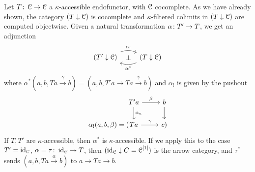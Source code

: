 \documentclass[a4paper,11pt,oneside,openany]{scrbook}
\begin{document}
Let $ T\colon \operatorname{\mathcal{C}} \to \operatorname{\mathcal{C}} $ a $ \kappa $-accessible endofunctor, with $ \operatorname{\mathcal{C}} $ cocomplete.
As we have already shown, the category $ (T \downarrow \operatorname{\mathcal{C}} )$ is cocomplete and $ \kappa $-filtered colimits in $ (T\downarrow\operatorname{\mathcal{C}}) $ are computed objectwise.
Given a natural transformation $ \alpha \colon T' \to T $, we get an adjunction
\begin{displaymath}
	\begin{tikzcd}
		(T' \downarrow \C) \arrow[r, "\alpha_!", bend left=20]
		\arrow[from=r, "\alpha^*", bend left=20]
		\arrow[r, phantom, "\bot"]
		& (T \downarrow \C)
	\end{tikzcd}
\end{displaymath}
where $ \alpha^*(a,b,Ta \xrightarrow{\gamma} b) = (a,b,T'a \to Ta \xrightarrow{\gamma} b) $
and $ \alpha_! $ is given by the pushout
\begin{displaymath}
	\begin{tikzcd}
		&[-3.3em]T'a \arrow[r,"\beta"]\arrow[d,"\alpha_a"]& b\arrow[d]\\
		\alpha_!(a,b,\beta)= (&	Ta \arrow[r, "\gamma"] & c)
	\end{tikzcd}
\end{displaymath}
If $ T,T' $ are $ \kappa $-accessible, then $ \alpha ^* $ is $ \kappa $-accessible.
If we apply this to the case $ T' = \operatorname{id}_{\operatorname{\mathcal{C}}} $, $ \alpha=\tau\colon \operatorname{id}_{\operatorname{\mathcal{C}}} \to T $, then $ (\operatorname{id}_{\operatorname{\mathcal{C}}} \downarrow C = \operatorname{\mathcal{C}} ^{[1]}) $ is the arrow category, and
$ \tau^* $ sends $ (a,b,Ta \xrightarrow{\alpha}b) $ to $ a \to Ta \to b $.
\end{document}
